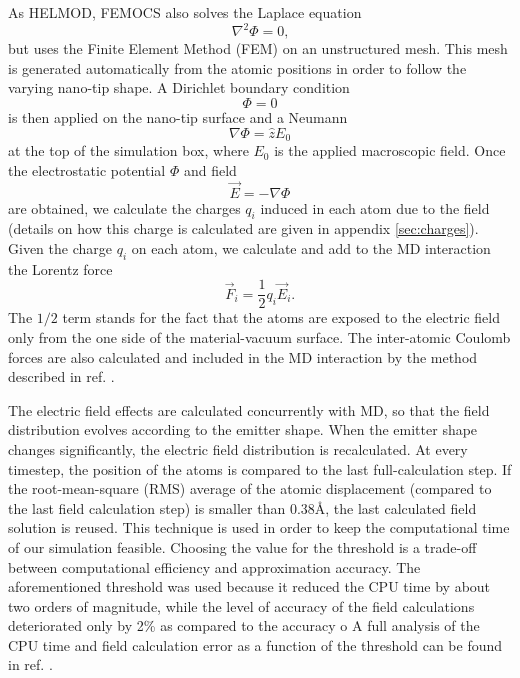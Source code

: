 \documentclass[%
 aps,
 prb,%
 amsmath,amssymb,
reprint,%
superscriptaddress,
]{revtex4-1}
\begin{document}
As HELMOD, FEMOCS also solves the Laplace equation 
\begin{equation} \label{eq:Laplace}
	\nabla^2 \Phi = 0 \textrm{,}
\end{equation}
but uses the Finite Element Method (FEM) on an unstructured mesh. 
This mesh is generated automatically from the atomic positions in order to follow the varying nano-tip shape. A Dirichlet boundary condition
\begin{equation} \label{eq:Dirichlet}
	\Phi=0 
\end{equation}
is then applied on the nano-tip surface and a Neumann
\begin{equation} \label{eq:Neumann}
	\nabla \Phi = \hat{z}E_0
\end{equation}
at the top of the simulation box, where $E_0$ is the applied macroscopic field.
Once the electrostatic potential $\Phi$ and field 
\begin{equation} \label{eq:Nabla}
	\vec{E} = - \nabla \Phi
\end{equation}
are obtained, we calculate the charges $q_i$ induced in each atom due to the field (details on how this charge is calculated are given in appendix \ref{sec:charges}).
Given the charge $q_i$ on each atom, we calculate and add to the MD interaction the Lorentz force
\begin{equation} \label{eq:Forces}
	\vec{F}_i = \frac{1}{2} q_i \vec{E}_i \textrm{.}
\end{equation}
The $1/2$ term stands for the fact that the atoms are exposed to the electric field only from the one side of the material-vacuum surface.
The inter-atomic Coulomb forces are also calculated and included in the MD interaction by the method described in ref. \cite{Djurabekova2011}.

The electric field effects are calculated concurrently with MD, so that the field distribution evolves according to the emitter shape. When the emitter shape changes significantly, the electric field distribution is recalculated.
At every timestep, the position of the atoms is compared to the last full-calculation step. 
If the root-mean-square (RMS) average of the atomic displacement (compared to the last field calculation step) is smaller than 0.38$\textrm{\AA}$, the last calculated field solution is reused.
This technique is used in order to keep the computational time of our simulation feasible. 
Choosing the value for the threshold is a trade-off between computational efficiency and approximation accuracy.
The aforementioned threshold was used because it reduced the CPU time by about two orders of magnitude, while the level of accuracy of the field calculations deteriorated only by 2\% as compared to the accuracy o
A full analysis of the CPU time and field calculation error as a function of the threshold can be found in ref. \cite{VekseDynamic_arxiv}.
\end{document}
